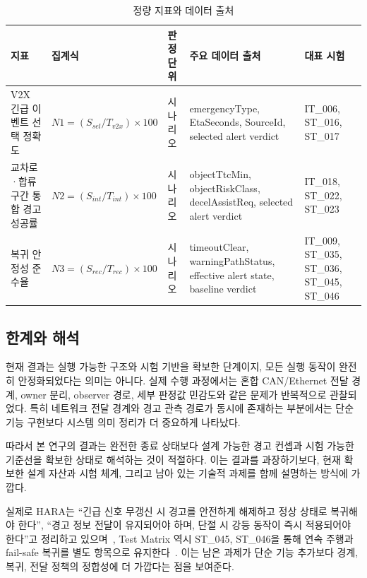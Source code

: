 \documentclass[11pt,a4paper]{article}
\begin{document}
\begin{table}[t]
\caption{정량 지표와 데이터 출처}
\label{tab:metric_sources}
\centering
\footnotesize
\setlength{\tabcolsep}{4pt}
\begin{tabularx}{\linewidth}{>{\raggedright\arraybackslash}p{2.6cm} >{\centering\arraybackslash}p{2.3cm} >{\raggedright\arraybackslash}p{1.7cm} >{\raggedright\arraybackslash}X >{\raggedright\arraybackslash}p{2.2cm}}
\toprule
지표 & 집계식 & 판정 단위 & 주요 데이터 출처 & 대표 시험 \\
\midrule
V2X 긴급 이벤트 선택 정확도 & $N1=(S_{sel}/T_{v2x})\times100$ & 시나리오 & emergencyType, EtaSeconds, SourceId, selected alert verdict & IT\_006, ST\_016, ST\_017 \\
교차로·합류구간 통합 경고 성공률 & $N2=(S_{int}/T_{int})\times100$ & 시나리오 & objectTtcMin, objectRiskClass, decelAssistReq, selected alert verdict & IT\_018, ST\_022, ST\_023 \\
복귀 안정성 준수율 & $N3=(S_{rec}/T_{rec})\times100$ & 시나리오 & timeoutClear, warningPathStatus, effective alert state, baseline verdict & IT\_009, ST\_035, ST\_036, ST\_045, ST\_046 \\
\bottomrule
\end{tabularx}
\end{table}

\subsection{한계와 해석}

현재 결과는 실행 가능한 구조와 시험 기반을 확보한 단계이지, 모든 실행 동작이 완전히 안정화되었다는 의미는 아니다. 실제 수행 과정에서는 혼합 CAN/Ethernet 전달 경계, owner 분리, observer 경로, 세부 판정값 민감도와 같은 문제가 반복적으로 관찰되었다. 특히 네트워크 전달 경계와 경고 관측 경로가 동시에 존재하는 부분에서는 단순 기능 구현보다 시스템 의미 정리가 더 중요하게 나타났다.

따라서 본 연구의 결과는 완전한 종료 상태보다 설계 가능한 경고 컨셉과 시험 가능한 기준선을 확보한 상태로 해석하는 것이 적절하다. 이는 결과를 과장하기보다, 현재 확보한 설계 자산과 시험 체계, 그리고 남아 있는 기술적 과제를 함께 설명하는 방식에 가깝다.

실제로 HARA는 ``긴급 신호 무갱신 시 경고를 안전하게 해제하고 정상 상태로 복귀해야 한다'', ``경고 정보 전달이 유지되어야 하며, 단절 시 강등 동작이 즉시 적용되어야 한다''고 정리하고 있으며~\cite{hara}, Test Matrix 역시 ST\_045, ST\_046을 통해 연속 주행과 fail-safe 복귀를 별도 항목으로 유지한다~\cite{master_test_matrix}. 이는 남은 과제가 단순 기능 추가보다 경계, 복귀, 전달 정책의 정합성에 더 가깝다는 점을 보여준다.
\end{document}
